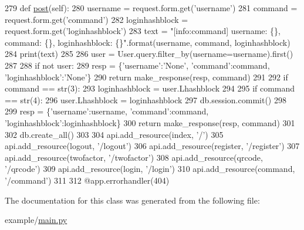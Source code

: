 \begin{DoxyCode}
279     \textcolor{keyword}{def }\hyperlink{classmain_1_1command_aad57d3ca75e00b96364b4dd9971f8d34}{post}(self):
280         username = request.form.get(\textcolor{stringliteral}{'username'})
281         command = request.form.get(\textcolor{stringliteral}{'command'})
282         loginhashblock = request.form.get(\textcolor{stringliteral}{'loginhashblock'})
283         text = \textcolor{stringliteral}{"[info:command] username: \{\}, command: \{\}, loginhashblock: \{\}"}.format(username, command, 
      loginhashblock)
284         print(text)
285 
286         user = User.query.filter\_by(username=username).first()
287 
288         \textcolor{keywordflow}{if} \textcolor{keywordflow}{not} user:
289             resp = \{\textcolor{stringliteral}{'username'}:\textcolor{stringliteral}{'None'}, \textcolor{stringliteral}{'command'}:command, \textcolor{stringliteral}{'loginhashblock'}:\textcolor{stringliteral}{'None'}\}
290             \textcolor{keywordflow}{return} make\_response(resp, command)
291 
292         \textcolor{keywordflow}{if} command == str(3):
293             loginhashblock = user.Lhashblock
294 
295         \textcolor{keywordflow}{if} command == str(4):
296             user.Lhashblock = loginhashblock
297             db.session.commit()
298 
299         resp = \{\textcolor{stringliteral}{'username'}:username, \textcolor{stringliteral}{'command'}:command, \textcolor{stringliteral}{'loginhashblock'}:loginhashblock\}
300         \textcolor{keywordflow}{return} make\_response(resp, command)
301 
302 db.create\_all()
303 
304 api.add\_resource(index, \textcolor{stringliteral}{'/'})
305 api.add\_resource(logout, \textcolor{stringliteral}{'/logout'})
306 api.add\_resource(register, \textcolor{stringliteral}{'/register'})
307 api.add\_resource(twofactor, \textcolor{stringliteral}{'/twofactor'})
308 api.add\_resource(qrcode, \textcolor{stringliteral}{'/qrcode'})
309 api.add\_resource(login, \textcolor{stringliteral}{'/login'})
310 api.add\_resource(command, \textcolor{stringliteral}{'/command'})
311 
312 @app.errorhandler(404)
\end{DoxyCode}


The documentation for this class was generated from the following file\+:\begin{DoxyCompactItemize}
\item 
example/\hyperlink{main_8py}{main.\+py}\end{DoxyCompactItemize}
